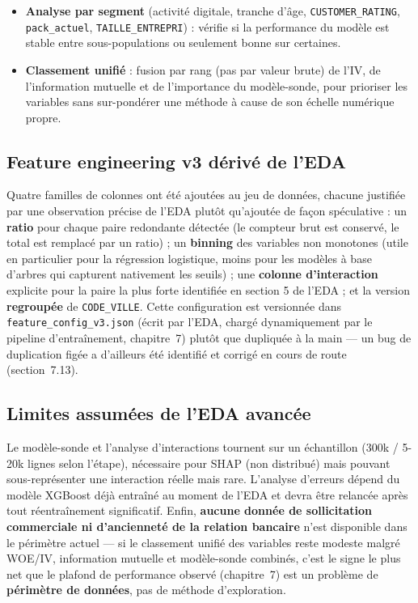 \documentclass[11pt,a4paper]{report}
\begin{document}
\begin{itemize}
  piste a été reprise et formalisée en profondeur au chapitre~7
  (section~7.9), avec un protocole d'évaluation strict (toujours sur la
  distribution réelle à 4,25\%, jamais un jeu rééquilibré ni un segment
  isolé — chapitre~7, section~7.4.1), qui a ramené l'estimation
  définitive du plafond de F1 à 0,22--0,24.
  \item \textbf{Analyse par segment} (activité digitale, tranche d'âge,
  \texttt{CUSTOMER\_RATING}, \texttt{pack\_actuel}, \texttt{TAILLE\_ENTREPRI}) :
  vérifie si la performance du modèle est stable entre sous-populations
  ou seulement bonne sur certaines.
  \item \textbf{Classement unifié} : fusion par rang (pas par valeur
  brute) de l'IV, de l'information mutuelle et de l'importance du
  modèle-sonde, pour prioriser les variables sans sur-pondérer une
  méthode à cause de son échelle numérique propre.
\end{itemize}

\subsection{Feature engineering v3 dérivé de l'EDA}
Quatre familles de colonnes ont été ajoutées au jeu de données, chacune
justifiée par une observation précise de l'EDA plutôt qu'ajoutée de façon
spéculative : un \textbf{ratio} pour chaque paire redondante détectée
(le compteur brut est conservé, le total est remplacé par un ratio) ; un
\textbf{binning} des variables non monotones (utile en particulier pour
la régression logistique, moins pour les modèles à base d'arbres qui
capturent nativement les seuils) ; une \textbf{colonne d'interaction}
explicite pour la paire la plus forte identifiée en section 5 de l'EDA ;
et la version \textbf{regroupée} de \texttt{CODE\_VILLE}. Cette
configuration est versionnée dans \texttt{feature\_config\_v3.json} (écrit
par l'EDA, chargé dynamiquement par le pipeline d'entraînement, chapitre~7)
plutôt que dupliquée à la main — un bug de duplication figée a d'ailleurs
été identifié et corrigé en cours de route (section~7.13).

\subsection{Limites assumées de l'EDA avancée}
Le modèle-sonde et l'analyse d'interactions tournent sur un échantillon
(300k / 5-20k lignes selon l'étape), nécessaire pour SHAP (non distribué)
mais pouvant sous-représenter une interaction réelle mais rare. L'analyse
d'erreurs dépend du modèle XGBoost déjà entraîné au moment de l'EDA et
devra être relancée après tout réentraînement significatif. Enfin,
\textbf{aucune donnée de sollicitation commerciale ni d'ancienneté de la
relation bancaire} n'est disponible dans le périmètre actuel — si le
classement unifié des variables reste modeste malgré WOE/IV, information
mutuelle et modèle-sonde combinés, c'est le signe le plus net que le
plafond de performance observé (chapitre~7) est un problème de
\textbf{périmètre de données}, pas de méthode d'exploration.
\end{document}

